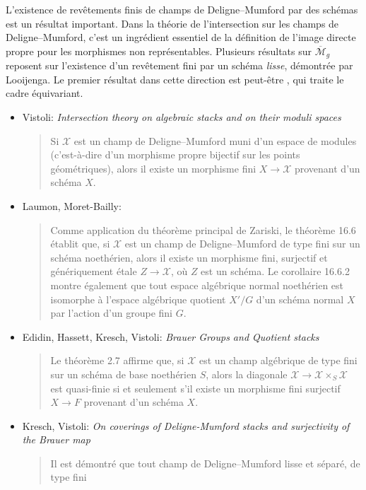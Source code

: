 \noindent
L'existence de revêtements finis de champs de Deligne--Mumford par des schémas
est un résultat important. Dans la théorie de l'intersection sur les champs de
Deligne--Mumford, c'est un ingrédient essentiel de la définition de l'image directe
propre pour les morphismes non représentables. Plusieurs
résultats sur $\overline{\mathcal{M}}_g$ reposent sur l'existence d'un revêtement
fini par un schéma \emph{lisse}, démontrée par Looijenga. Le premier résultat dans
cette direction est peut-être \cite[théorème 6.1]{seshadri_quotients},
qui traite le cadre équivariant.
\begin{itemize}
\item Vistoli: \emph{Intersection theory on algebraic stacks and on their
moduli spaces} \cite{vistoli_intersection}
\begin{quote}
Si $\mathcal{X}$ est un champ de Deligne--Mumford muni d'un espace de modules
(c'est-à-dire d'un morphisme propre
bijectif sur les points géométriques), alors il existe un morphisme fini
$X \to \mathcal{X}$ provenant d'un schéma $X$.
\end{quote}
\item Laumon, Moret-Bailly: \cite[chapitre 16]{LM-B}
\begin{quote}
Comme application du théorème principal de Zariski, le théorème 16.6 établit que,
si $\mathcal{X}$ est un champ de Deligne--Mumford de type fini sur un schéma
noethérien, alors
il existe un morphisme fini, surjectif et génériquement étale $Z \to
\mathcal{X}$,
où $Z$ est un schéma. Le corollaire 16.6.2 montre également que tout espace
algébrique normal noethérien est isomorphe à l'espace algébrique quotient $X'/G$
d'un schéma normal $X$ par l'action d'un groupe fini $G$.
\end{quote}
\item Edidin, Hassett, Kresch, Vistoli:
\emph{Brauer Groups and Quotient stacks} \cite{ehkv}
\begin{quote}
Le théorème 2.7 affirme que,
si $\mathcal{X}$ est un champ algébrique de type fini sur un
schéma de base noethérien $S$, alors la diagonale
$\mathcal{X} \to \mathcal{X} \times_S \mathcal{X}$ est
quasi-finie si et seulement s'il existe un morphisme fini surjectif
$X \to F$ provenant d'un schéma $X$.
\end{quote}
\item Kresch, Vistoli: \emph{On coverings of Deligne-Mumford stacks and
surjectivity of the Brauer map} \cite{kresch-vistoli}
\begin{quote}
Il est démontré que tout champ de Deligne--Mumford lisse et séparé, de type fini

\end{quote}
\end{itemize}
